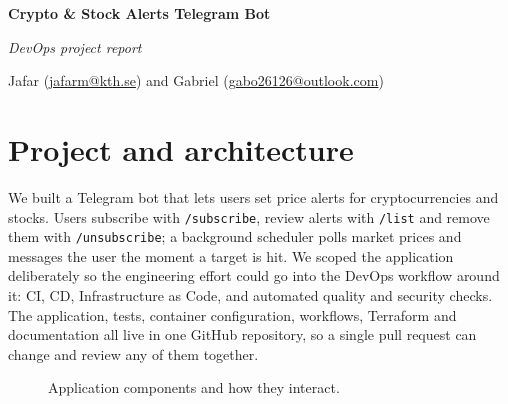 \documentclass[11pt,a4paper]{article}
\begin{document}
{\LARGE\bfseries Crypto \& Stock Alerts Telegram Bot}\par
\vspace{2pt}
{\large\itshape DevOps project report}\par
\vspace{2pt}
{\large Jafar (\href{mailto:jafarm@kth.se}{jafarm@kth.se}) and Gabriel (\href{mailto:gaag2@kth.se}{gabo26126@outlook.com})}\par

\section{Project and architecture}

We built a Telegram bot that lets users set price alerts for cryptocurrencies and stocks. Users subscribe with \texttt{/subscribe}, review alerts with \texttt{/list} and remove them with \texttt{/unsubscribe}; a background scheduler polls market prices and messages the user the moment a target is hit. We scoped the application deliberately so the engineering effort could go into the DevOps workflow around it: CI, CD, Infrastructure as Code, and automated quality and security checks. The application, tests, container configuration, workflows, Terraform and documentation all live in one GitHub repository, so a single pull request can change and review any of them together.

\begin{figure}[h]
\centering
{}
\caption{Application components and how they interact.}
\end{figure}
\end{document}
